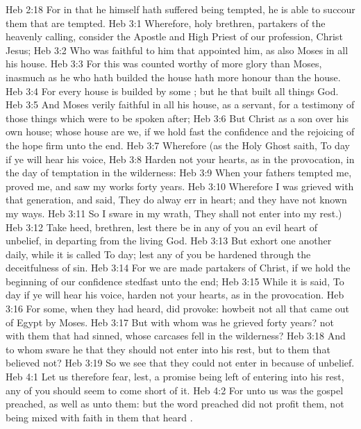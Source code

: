 \vs Heb 2:18 For in that he himself hath suffered being tempted, he is able to succour them that are tempted.
\vs Heb 3:1 Wherefore, holy brethren, partakers of the heavenly calling, consider the Apostle and High Priest of our profession, Christ Jesus;
\vs Heb 3:2 Who was faithful to him that appointed him, as also Moses  in all his house.
\vs Heb 3:3 For this  was counted worthy of more glory than Moses, inasmuch as he who hath builded the house hath more honour than the house.
\vs Heb 3:4 For every house is builded by some ; but he that built all things  God.
\vs Heb 3:5 And Moses verily  faithful in all his house, as a servant, for a testimony of those things which were to be spoken after;
\vs Heb 3:6 But Christ as a son over his own house; whose house are we, if we hold fast the confidence and the rejoicing of the hope firm unto the end.
\vs Heb 3:7 Wherefore (as the Holy Ghost saith, To day if ye will hear his voice,
\vs Heb 3:8 Harden not your hearts, as in the provocation, in the day of temptation in the wilderness:
\vs Heb 3:9 When your fathers tempted me, proved me, and saw my works forty years.
\vs Heb 3:10 Wherefore I was grieved with that generation, and said, They do alway err in  heart; and they have not known my ways.
\vs Heb 3:11 So I sware in my wrath, They shall not enter into my rest.)
\vs Heb 3:12 Take heed, brethren, lest there be in any of you an evil heart of unbelief, in departing from the living God.
\vs Heb 3:13 But exhort one another daily, while it is called To day; lest any of you be hardened through the deceitfulness of sin.
\vs Heb 3:14 For we are made partakers of Christ, if we hold the beginning of our confidence stedfast unto the end;
\vs Heb 3:15 While it is said, To day if ye will hear his voice, harden not your hearts, as in the provocation.
\vs Heb 3:16 For some, when they had heard, did provoke: howbeit not all that came out of Egypt by Moses.
\vs Heb 3:17 But with whom was he grieved forty years?  not with them that had sinned, whose carcases fell in the wilderness?
\vs Heb 3:18 And to whom sware he that they should not enter into his rest, but to them that believed not?
\vs Heb 3:19 So we see that they could not enter in because of unbelief.
\vs Heb 4:1 Let us therefore fear, lest, a promise being left  of entering into his rest, any of you should seem to come short of it.
\vs Heb 4:2 For unto us was the gospel preached, as well as unto them: but the word preached did not profit them, not being mixed with faith in them that heard .
